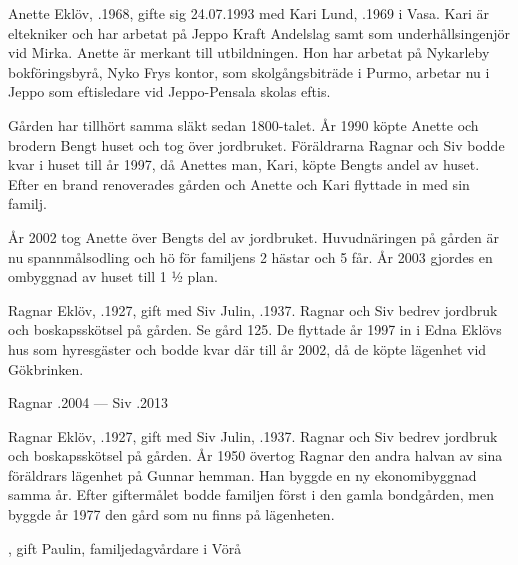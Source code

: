 Anette Eklöv, .1968, gifte sig 24.07.1993 med Kari Lund, .1969 i Vasa. Kari är eltekniker och har arbetat på Jeppo Kraft Andelslag samt som underhållsingenjör vid Mirka. Anette är merkant till utbildningen. Hon 	har arbetat på Nykarleby bokföringsbyrå, Nyko Frys kontor, som skolgångsbiträde i Purmo, arbetar nu i Jeppo som eftisledare vid Jeppo-Pensala skolas eftis.
\begin{jhchildren}
  \item {}
  \item {}
  \item {}
\end{jhchildren}

Gården har tillhört samma släkt sedan 1800-talet. År 1990 köpte Anette och brodern Bengt huset och tog över jordbruket. Föräldrarna Ragnar och Siv bodde kvar i huset till år 1997, då Anettes man, Kari, köpte Bengts andel av huset. Efter en brand renoverades gården och Anette och Kari flyttade in med sin familj.

År 2002 tog Anette över Bengts del av jordbruket. Huvudnäringen på gården är nu spannmålsodling och hö för familjens 2 hästar och 5 får. År 2003 gjordes en ombyggnad av huset till 1 ½ plan.


Ragnar Eklöv, .1927, gift med Siv Julin, .1937. Ragnar och Siv bedrev jordbruk och boskapsskötsel på gården. Se gård 125. De flyttade år 1997 in i Edna Eklövs hus som hyresgäster och bodde kvar där till år 2002, då de köpte lägenhet vid Gökbrinken.

Ragnar .2004  ---  Siv .2013





Ragnar Eklöv, .1927, gift med Siv Julin, .1937. Ragnar och Siv bedrev jordbruk och boskapsskötsel på gården. År 1950 övertog Ragnar den andra halvan av sina föräldrars lägenhet på Gunnar hemman. Han byggde en ny ekonomibyggnad samma år. Efter giftermålet bodde familjen först i den gamla bondgården, men byggde år 1977 den gård som nu finns på lägenheten.
\begin{jhchildren}
  \item {}
  \item {}
  \item {}, gift Paulin, familjedagvårdare i Vörå
\end{jhchildren}

